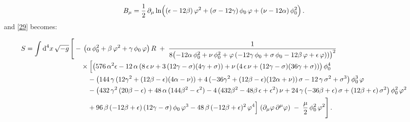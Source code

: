 \documentclass[aps,prd,reprint,preprintnumbers,showpacs,floatfix,nofootinbib,superscript address]{revtex4-2}
\begin{document}
\begin{equation}\label{30}
B_\mu = \frac{1}{2}\,\partial_\mu \ln\Bigl((\epsilon-12\beta)\,\varphi^2 + (\sigma-12\gamma)\,\phi_0\,\varphi + (\nu-12\alpha)\,\phi_0^2\Bigr)\,.
\end{equation}
and \cref{29} becomes:
\begin{widetext}
\begin{subequations}
\begin{align}  \label{42a}
S = \int \text{d}^4x\,\sqrt{-g}\,\Biggl[ 
  &-\,\bigl(\alpha\,\phi_0^2 + \beta\,\varphi^2 + \gamma\,\phi_0\,\varphi\bigr)\,R
  \;+\;
    \frac{1}{8\bigl(-12\alpha\,\phi_0^2 + \nu\,\phi_0^2 
      + \varphi\,(-12\gamma\,\phi_0 + \sigma\,\phi_0 - 12\beta\,\varphi + \epsilon\,\varphi))\bigr)^2}
    \nonumber\\[-0.5ex]
  &\quad\times
    \Bigl[
      \bigl(576\,\alpha^2\epsilon 
        -12\,\alpha\,(8\,\epsilon\,\nu + 3\,(12\gamma - \sigma)(4\gamma + \sigma))
        + \nu\,(4\,\epsilon\,\nu + (12\gamma - \sigma)(36\gamma + \sigma))
      \bigr)\,\phi_0^4 
    \nonumber\\
  &\quad\quad
    -\bigl(
      144\,\gamma\,(12\gamma^2 + (12\beta - \epsilon)(4\alpha - \nu))
      +4\,(-36\gamma^2 + (12\beta - \epsilon)(12\alpha + \nu))\,\sigma
      -12\,\gamma\,\sigma^2
      +\sigma^3
    \bigr)\,\phi_0^3\,\varphi
    \nonumber\\
  &\quad\quad
    -\bigl(
      432\,\gamma^2\,(20\beta - \epsilon)
      +48\,\alpha\,(144\beta^2 - \epsilon^2)
      -4\,(432\beta^2 - 48\beta\,\epsilon + \epsilon^2)\,\nu
      +24\,\gamma\,(-36\beta + \epsilon)\,\sigma
      +(12\beta + \epsilon)\,\sigma^2
    \bigr)\,\phi_0^2\,\varphi^2
    \nonumber\\
  &\quad\quad
    +96\,\beta\,(-12\beta + \epsilon)\,(12\gamma - \sigma)\,\phi_0\,\varphi^3
    -48\,\beta\,(-12\beta + \epsilon)^2\,\varphi^4
    \Bigr]
    \;(\partial_{\mu}\varphi\,\partial^{\mu}\varphi)
  \;-\;\frac{\mu}{2}\,\phi_0^2\,\varphi^2
\Biggr]\,.
\end{align}
\end{subequations}
\end{widetext}
\end{document}
